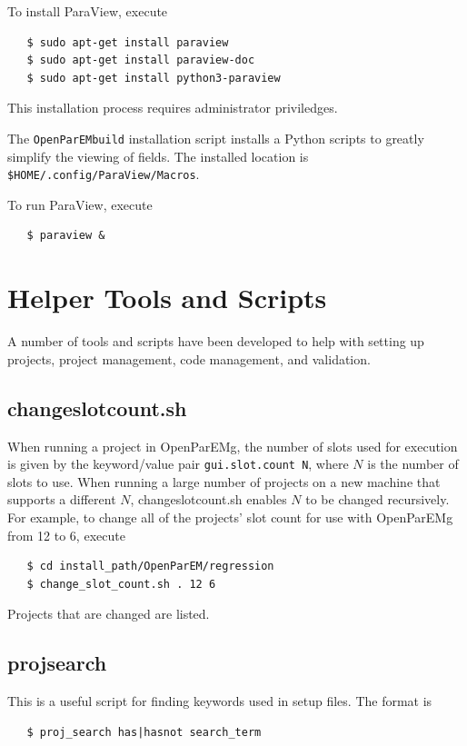 \documentclass[titlepage]{article}
\renewcommand\_{\textunderscore\linebreak[1]}
\begin{document}
To install ParaView, execute
\begin{verbatim}
   $ sudo apt-get install paraview
   $ sudo apt-get install paraview-doc
   $ sudo apt-get install python3-paraview
\end{verbatim}
\noindent This installation process requires administrator priviledges.

The \texttt{OpenParEM\_build} installation script installs a Python scripts to greatly simplify the viewing of fields.  The installed location is \texttt{\$HOME/.config/ParaView/Macros}.

To run ParaView, execute
\begin{verbatim}
   $ paraview &
\end{verbatim}

\section{Helper Tools and Scripts}

A number of tools and scripts have been developed to help with setting up projects, project management, code management, and validation.

\subsection{change\_slot\_count.sh}

When running a project in OpenParEMg, the number of slots used for execution is given by the keyword/value pair \texttt{gui.slot.count N}, where $N$ is the number of slots to use.  When running a large number of projects on a new machine that supports a different $N$, change\_slot\_count.sh enables $N$ to be changed recursively.  For example, to change all of the projects' slot count for use with OpenParEMg from 12 to 6, execute
\begin{verbatim}
   $ cd install_path/OpenParEM/regression
   $ change_slot_count.sh . 12 6
\end{verbatim}

\noindent Projects that are changed are listed.

\subsection{proj\_search}

This is a useful script for finding keywords used in setup files.  The format is

\begin{verbatim}
   $ proj_search has|hasnot search_term
\end{verbatim}
\end{document}
